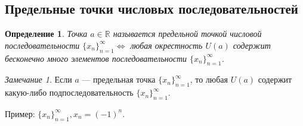 \documentclass[a4paper,12pt]{article} %
\newtheorem{definition}{Определение}[section]
\theoremstyle{remark}
\newtheorem{remark}{Замечание}[theorem]
\theoremstyle{definition}
\begin{document}
\subsection{Предельные точки числовых последовательностей}
\begin{definition}
	Точка $a\in \mathbb{R}$ называется предельной точкой числовой последовательности $\{x_n\}_{n=1}^{\infty} \iff$
    любая окрестность $U(a)$ содержит бесконечно много элементов последовательности $\{x_n\}_{n=1}^{\infty} $.
\end{definition}
\begin{remark}
	Если $a$ --- предельная точка $\{x_n\}_{n=1}^{\infty} $,
    то любая $U(a)$ содержит какую-либо подпоследовательность $\{x_n\}_{n=1}^{\infty} $.
\end{remark}
Пример: $\{x_n\}_{n=1}^{\infty}, x_{n}=(-1)^{n}$. 
\begin{center}
\end{center}
\end{document}
